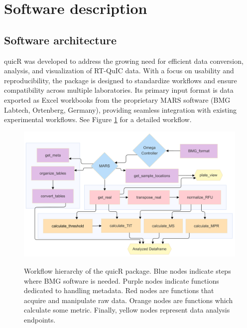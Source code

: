 \documentclass[preprint,12pt, a4paper]{elsarticle}
\begin{document}
% 

\section{Software description}
    \subsection{Software architecture}
        quicR was developed to address the growing need for efficient data conversion, analysis, and visualization of RT-QuIC data. With a focus on usability and reproducibility, the package is designed to standardize workflows and ensure compatibility across multiple laboratories. Its primary input format is data exported as Excel workbooks from the proprietary MARS software (BMG Labtech, Ortenberg, Germany), providing seamless integration with existing experimental workflows. See Figure \ref{fig:workflow} for a detailed workflow.
        \begin{figure}[ht]
            \caption{Workflow hierarchy of the quicR package. Blue nodes indicate steps where BMG software is needed. Purple nodes indicate functions dedicated to handling metadata. Red nodes are functions that acquire and manipulate raw data. Orange nodes are functions which calculate some metric. Finally, yellow nodes represent data analysis endpoints.}
            \centering
            \includegraphics[width=\textwidth]{images/workflow2.png}
            \label{fig:workflow}
        \end{figure}
\end{document}
